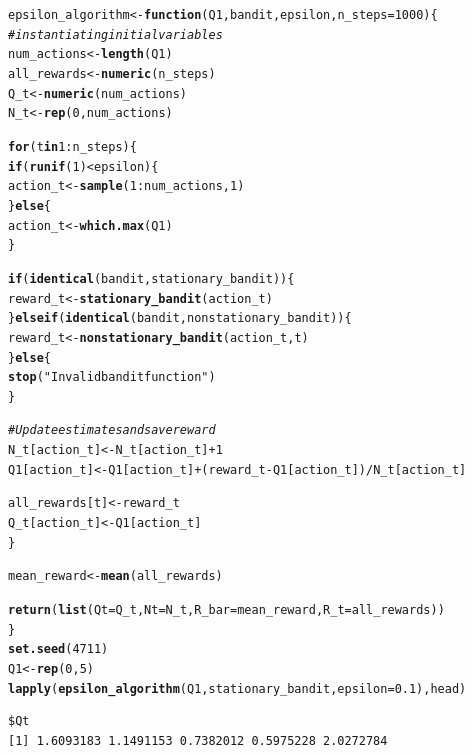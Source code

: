 \documentclass[10pt, a4paper, english]{article}\usepackage[]{graphicx}\usepackage[dvipsnames]{xcolor}
\makeatletter
\newcommand{\hlnum}[1]{\textcolor[rgb]{0.686,0.059,0.569}{#1}}%
\newcommand{\hlstr}[1]{\textcolor[rgb]{0.192,0.494,0.8}{#1}}%
\newcommand{\hlcom}[1]{\textcolor[rgb]{0.678,0.584,0.686}{\textit{#1}}}%
\newcommand{\hlopt}[1]{\textcolor[rgb]{0,0,0}{#1}}%
\newcommand{\hlstd}[1]{\textcolor[rgb]{0.345,0.345,0.345}{#1}}%
\newcommand{\hlkwa}[1]{\textcolor[rgb]{0.161,0.373,0.58}{\textbf{#1}}}%
\newcommand{\hlkwb}[1]{\textcolor[rgb]{0.69,0.353,0.396}{#1}}%
\newcommand{\hlkwc}[1]{\textcolor[rgb]{0.333,0.667,0.333}{#1}}%
\newcommand{\hlkwd}[1]{\textcolor[rgb]{0.737,0.353,0.396}{\textbf{#1}}}%
\newenvironment{kframe}{%
 \def\at@end@of@kframe{}%
 \ifinner\ifhmode%
  \def\at@end@of@kframe{\end{minipage}}%
  \begin{minipage}{\columnwidth}%
 \fi\fi%
 \def\FrameCommand##1{\hskip\@totalleftmargin \hskip-\fboxsep
 \colorbox{shadecolor}{##1}\hskip-\fboxsep
     \hskip-\linewidth \hskip-\@totalleftmargin \hskip\columnwidth}%
 \MakeFramed {\advance\hsize-\width
   \@totalleftmargin\z@ \linewidth\hsize
   \@setminipage}}%
 {\par\unskip\endMakeFramed%
 \at@end@of@kframe}
\newenvironment{knitrout}{}{} %
\makeatother
\begin{document}
\begin{knitrout}
\color{fgcolor}\begin{kframe}
\begin{alltt}
\hlstd{epsilon_algorithm} \hlkwb{<-} \hlkwa{function}\hlstd{(}\hlkwc{Q1}\hlstd{,} \hlkwc{bandit}\hlstd{,} \hlkwc{epsilon}\hlstd{,} \hlkwc{n_steps}\hlstd{=}\hlnum{1000}\hlstd{) \{}
  \hlcom{#instantiating initial variables}
  \hlstd{num_actions} \hlkwb{<-} \hlkwd{length}\hlstd{(Q1)}
  \hlstd{all_rewards} \hlkwb{<-} \hlkwd{numeric}\hlstd{(n_steps)}
  \hlstd{Q_t} \hlkwb{<-} \hlkwd{numeric}\hlstd{(num_actions)}
  \hlstd{N_t} \hlkwb{<-}\hlkwd{rep}\hlstd{(}\hlnum{0}\hlstd{, num_actions)}

  \hlkwa{for} \hlstd{(t} \hlkwa{in} \hlnum{1}\hlopt{:}\hlstd{n_steps) \{}
    \hlkwa{if} \hlstd{(}\hlkwd{runif}\hlstd{(}\hlnum{1}\hlstd{)} \hlopt{<} \hlstd{epsilon) \{}
      \hlstd{action_t} \hlkwb{<-} \hlkwd{sample}\hlstd{(}\hlnum{1}\hlopt{:}\hlstd{num_actions,} \hlnum{1}\hlstd{)}
    \hlstd{\}} \hlkwa{else} \hlstd{\{}
      \hlstd{action_t} \hlkwb{<-} \hlkwd{which.max}\hlstd{(Q1)}
    \hlstd{\}}

     \hlkwa{if} \hlstd{(}\hlkwd{identical}\hlstd{(bandit, stationary_bandit)) \{}
      \hlstd{reward_t} \hlkwb{<-} \hlkwd{stationary_bandit}\hlstd{(action_t)}
    \hlstd{\}} \hlkwa{else if} \hlstd{(}\hlkwd{identical}\hlstd{(bandit, nonstationary_bandit)) \{}
      \hlstd{reward_t} \hlkwb{<-} \hlkwd{nonstationary_bandit}\hlstd{(action_t, t)}
    \hlstd{\}} \hlkwa{else} \hlstd{\{}
      \hlkwd{stop}\hlstd{(}\hlstr{"Invalid bandit function"}\hlstd{)}
    \hlstd{\}}

    \hlcom{# Update estimates and save reward}
    \hlstd{N_t[action_t]} \hlkwb{<-} \hlstd{N_t[action_t]} \hlopt{+} \hlnum{1}
    \hlstd{Q1[action_t]} \hlkwb{<-} \hlstd{Q1[action_t]} \hlopt{+} \hlstd{(reward_t} \hlopt{-} \hlstd{Q1[action_t])} \hlopt{/} \hlstd{N_t[action_t]}

    \hlstd{all_rewards[t]} \hlkwb{<-} \hlstd{reward_t}
    \hlstd{Q_t[action_t]} \hlkwb{<-} \hlstd{Q1[action_t]}
  \hlstd{\}}

  \hlstd{mean_reward} \hlkwb{<-} \hlkwd{mean}\hlstd{(all_rewards)}

  \hlkwd{return}\hlstd{(}\hlkwd{list}\hlstd{(}\hlkwc{Qt} \hlstd{= Q_t,} \hlkwc{Nt} \hlstd{= N_t,} \hlkwc{R_bar} \hlstd{= mean_reward,} \hlkwc{R_t} \hlstd{= all_rewards))}
\hlstd{\}}
\hlkwd{set.seed}\hlstd{(}\hlnum{4711}\hlstd{)}
\hlstd{Q1} \hlkwb{<-} \hlkwd{rep}\hlstd{(}\hlnum{0}\hlstd{,} \hlnum{5}\hlstd{)}
\hlkwd{lapply}\hlstd{(}\hlkwd{epsilon_algorithm}\hlstd{(Q1, stationary_bandit,} \hlkwc{epsilon} \hlstd{=} \hlnum{0.1}\hlstd{), head)}
\end{alltt}
\begin{verbatim}
$Qt
[1] 1.6093183 1.1491153 0.7382012 0.5975228 2.0272784


\end{verbatim}
\end{kframe}
\end{knitrout}
\end{document}
